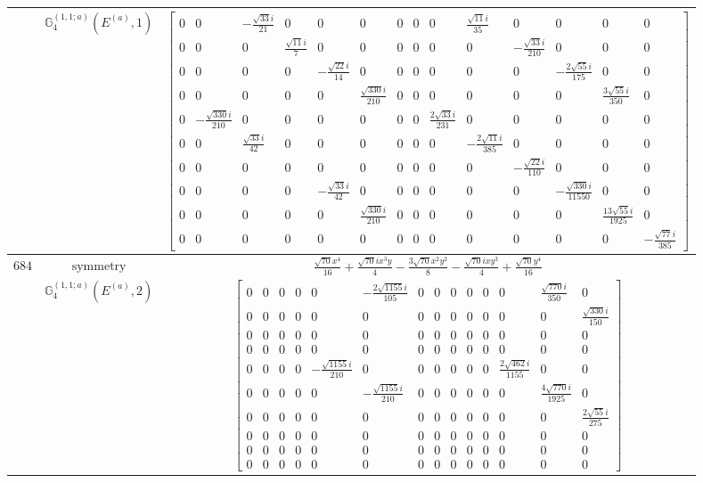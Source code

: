 \documentclass[fleqn,8pt,landscape]{jsarticle}
\begin{document}
\begin{longtable}{ccc}
$  $ & $ \mathbb{G}_{4}^{(1,1;a)}(E^{(a)},1) $ & $ \begin{bmatrix} 0 & 0 & - \frac{\sqrt{33} i}{21} & 0 & 0 & 0 & 0 & 0 & 0 & \frac{\sqrt{11} i}{35} & 0 & 0 & 0 & 0 \\ 0 & 0 & 0 & \frac{\sqrt{11} i}{7} & 0 & 0 & 0 & 0 & 0 & 0 & - \frac{\sqrt{33} i}{210} & 0 & 0 & 0 \\ 0 & 0 & 0 & 0 & - \frac{\sqrt{22} i}{14} & 0 & 0 & 0 & 0 & 0 & 0 & - \frac{2 \sqrt{55} i}{175} & 0 & 0 \\ 0 & 0 & 0 & 0 & 0 & \frac{\sqrt{330} i}{210} & 0 & 0 & 0 & 0 & 0 & 0 & \frac{3 \sqrt{55} i}{350} & 0 \\ 0 & - \frac{\sqrt{330} i}{210} & 0 & 0 & 0 & 0 & 0 & 0 & \frac{2 \sqrt{33} i}{231} & 0 & 0 & 0 & 0 & 0 \\ 0 & 0 & \frac{\sqrt{33} i}{42} & 0 & 0 & 0 & 0 & 0 & 0 & - \frac{2 \sqrt{11} i}{385} & 0 & 0 & 0 & 0 \\ 0 & 0 & 0 & 0 & 0 & 0 & 0 & 0 & 0 & 0 & - \frac{\sqrt{22} i}{110} & 0 & 0 & 0 \\ 0 & 0 & 0 & 0 & - \frac{\sqrt{33} i}{42} & 0 & 0 & 0 & 0 & 0 & 0 & - \frac{\sqrt{330} i}{11550} & 0 & 0 \\ 0 & 0 & 0 & 0 & 0 & \frac{\sqrt{330} i}{210} & 0 & 0 & 0 & 0 & 0 & 0 & \frac{13 \sqrt{55} i}{1925} & 0 \\ 0 & 0 & 0 & 0 & 0 & 0 & 0 & 0 & 0 & 0 & 0 & 0 & 0 & - \frac{\sqrt{77} i}{385} \end{bmatrix} $ \\ \hline
$ 684 $ & $ \text{symmetry} $ & $ \frac{\sqrt{70} x^{4}}{16} + \frac{\sqrt{70} i x^{3} y}{4} - \frac{3 \sqrt{70} x^{2} y^{2}}{8} - \frac{\sqrt{70} i x y^{3}}{4} + \frac{\sqrt{70} y^{4}}{16} $ \\
$  $ & $ \mathbb{G}_{4}^{(1,1;a)}(E^{(a)},2) $ & $ \begin{bmatrix} 0 & 0 & 0 & 0 & 0 & - \frac{2 \sqrt{1155} i}{105} & 0 & 0 & 0 & 0 & 0 & 0 & \frac{\sqrt{770} i}{350} & 0 \\ 0 & 0 & 0 & 0 & 0 & 0 & 0 & 0 & 0 & 0 & 0 & 0 & 0 & \frac{\sqrt{330} i}{150} \\ 0 & 0 & 0 & 0 & 0 & 0 & 0 & 0 & 0 & 0 & 0 & 0 & 0 & 0 \\ 0 & 0 & 0 & 0 & 0 & 0 & 0 & 0 & 0 & 0 & 0 & 0 & 0 & 0 \\ 0 & 0 & 0 & 0 & - \frac{\sqrt{1155} i}{210} & 0 & 0 & 0 & 0 & 0 & 0 & \frac{2 \sqrt{462} i}{1155} & 0 & 0 \\ 0 & 0 & 0 & 0 & 0 & - \frac{\sqrt{1155} i}{210} & 0 & 0 & 0 & 0 & 0 & 0 & \frac{4 \sqrt{770} i}{1925} & 0 \\ 0 & 0 & 0 & 0 & 0 & 0 & 0 & 0 & 0 & 0 & 0 & 0 & 0 & \frac{2 \sqrt{55} i}{275} \\ 0 & 0 & 0 & 0 & 0 & 0 & 0 & 0 & 0 & 0 & 0 & 0 & 0 & 0 \\ 0 & 0 & 0 & 0 & 0 & 0 & 0 & 0 & 0 & 0 & 0 & 0 & 0 & 0 \\ 0 & 0 & 0 & 0 & 0 & 0 & 0 & 0 & 0 & 0 & 0 & 0 & 0 & 0 \end{bmatrix} $ \\ \hline

\end{longtable}
\end{document}
